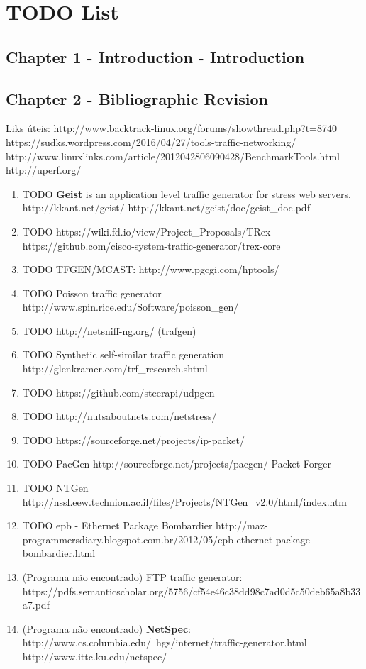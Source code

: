 \chapter{TODO List}


\section{Chapter 1 - Introduction - Introduction}


\section{Chapter 2 - Bibliographic Revision }

Liks úteis: 
http://www.backtrack-linux.org/forums/showthread.php?t=8740
https://sudks.wordpress.com/2016/04/27/tools-traffic-networking/
http://www.linuxlinks.com/article/2012042806090428/BenchmarkTools.html
http://uperf.org/

\begin{enumerate}

\item TODO \textbf{Geist}\cite{geist-paper} is an application level traffic generator for stress web servers. http://kkant.net/geist/ http://kkant.net/geist/doc/geist\_doc.pdf 

\item TODO https://wiki.fd.io/view/Project\_Proposals/TRex https://github.com/cisco-system-traffic-generator/trex-core
\item TODO TFGEN/MCAST: http://www.pgcgi.com/hptools/
\item TODO Poisson traffic generator http://www.spin.rice.edu/Software/poisson\_gen/
\item TODO http://netsniff-ng.org/ (trafgen)
\item TODO Synthetic self-similar traffic generation http://glenkramer.com/trf\_research.shtml
\item  TODO https://github.com/steerapi/udpgen
\item TODO  http://nutsaboutnets.com/netstress/
\item TODO https://sourceforge.net/projects/ip-packet/
\item TODO PacGen http://sourceforge.net/projects/pacgen/ Packet Forger
\item TODO NTGen http://nssl.eew.technion.ac.il/files/Projects/NTGen\_v2.0/html/index.htm
\item TODO epb - Ethernet Package Bombardier  http://maz-programmersdiary.blogspot.com.br/2012/05/epb-ethernet-package-bombardier.html 


\item (Programa não encontrado) FTP traffic generator: https://pdfs.semanticscholar.org/5756/cf54e46c38dd98c7ad0d5c50deb65a8b33a7.pdf
\item (Programa não encontrado) \textbf{NetSpec}: http://www.cs.columbia.edu/~hgs/internet/traffic-generator.html http://www.ittc.ku.edu/netspec/

\end{enumerate}
